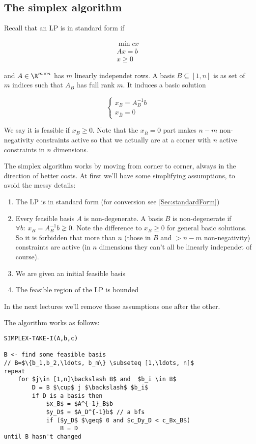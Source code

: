 \subsection{The simplex algorithm}
Recall that an LP is in standard form if

\begin{align*}
\min cx\\
Ax = b\\
x\geq 0
\end{align*}

and $A\in \R^{m\times n}$ has $m$ linearly independet rows. A basis $B\subseteq [1,n]$ is as set of $m$ indices such that $A_B$ has full rank $m$. It induces a basic solution

\[\begin{cases} x_B = A^{-1}_Bb\\ x_{\bar B} = 0\end{cases}\]

We say it is feasible if $x_B\geq 0$. Note that the $x_{\bar B}=0$ part makes $n-m$ non-negativity constraints active so that we actually are at a corner with $n$ active constraints in $n$ dimensions.

The simplex algorithm works by moving from corner to corner, always in the direction of better costs. At first we'll have some simplifying assumptions, to avoid the messy details:

\begin{enumerate}
\item The LP is in standard form (for conversion see \ref{Sec:standardForm})
\item Every feasible basis $A$ is non-degenerate. A basis $B$ is non-degenerate if $\forall b:\ x_B=A^{-1}_Bb \gneq 0$. Note the difference to $x_B\geq 0$ for general basic solutions. So it is forbidden that more than $n$ (those in $B$ and $>n-m$ non-negativity) constraints are active (in $n$ dimensions they can't all be linearly independet of course). 
\item We are given an initial feasible basis
\item The feasible region of the LP is bounded
\end{enumerate}

In the next lectures we'll remove those assumptions one after the other.

The algorithm works as follows:
\begin{lstlisting}
SIMPLEX-TAKE-I(A,b,c)

B <- find some feasible basis
// B=$\{b_1,b_2,\ldots, b_m\} \subseteq [1,\ldots, n]$
repeat 
    for $j\in [1,n]\backslash B$ and  $b_i \in B$
        D = B $\cup$ j $\backslash$ $b_i$
        if D is a basis then
            $x_B$ = $A^{-1}_B$b
            $y_D$ = $A_D^{-1}b$ // a bfs
            if ($y_D$ $\geq$ 0 and $c_Dy_D < c_Bx_B$)
                B = D
until B hasn't changed                
\end{lstlisting}

